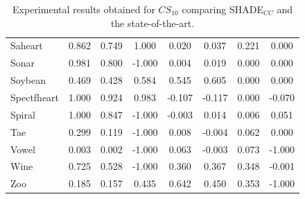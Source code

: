 \documentclass[review]{elsarticle}
\begin{document}
\begin{table}[!h]
{\begin{tabular}{lccccccc}
			Saheart & 0.862 & 0.749 & 1.000 & 0.020 & 0.037 & 0.221 & 0.000 \\
			Sonar & 0.981 & 0.800 & -1.000 & 0.004 & 0.019 & 0.000 & 0.000 \\
			Soybean & 0.469 & 0.428 & 0.584 & 0.545 & 0.605 & 0.000 & 0.000 \\
			Spectfheart & 1.000 & 0.924 & 0.983 & -0.107 & -0.117 & 0.000 & -0.070 \\
			Spiral & 1.000 & 0.847 & -1.000 & -0.003 & 0.014 & 0.006 & 0.051 \\
			Tae & 0.299 & 0.119 & -1.000 & 0.008 & -0.004 & 0.062 & 0.000 \\
			Vowel & 0.003 & 0.002 & -1.000 & 0.063 & -0.003 & 0.073 & -1.000 \\
			Wine & 0.725 & 0.528 & -1.000 & 0.360 & 0.367 & 0.348 & -0.001 \\
			Zoo & 0.185 & 0.157 & 0.435 & 0.642 & 0.450 & 0.353 & -1.000 \\
			\hline
			
		\end{tabular}}
		
		\caption{Experimental results obtained for $CS_{10}$ comparing SHADE$_{CC}$ and the state-of-the-art.}
		\label{tab:results15SOTA}
	\end{table}
\end{document}
